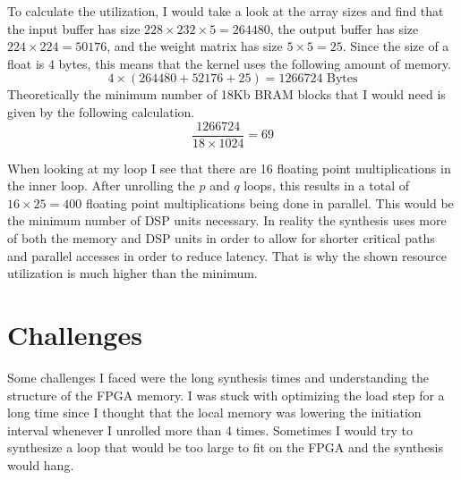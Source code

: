 \documentclass[12pt]{article}
\begin{document}
To calculate the utilization, I would take a look at the array sizes and find that the input buffer has size
\(228\times232\times5=264480\), the output buffer has size \(224\times 224=50176\), and the weight matrix has
size \(5\times 5=25\). Since the size of a float is 4 bytes, this means that the kernel uses the following amount
of memory.
\[4\times(264480+52176+25)=1266724 \text{ Bytes}\]
Theoretically the minimum number of 18Kb BRAM blocks that I would need is given by the following calculation.
\[\frac{1266724}{18\times1024}=69\]

When looking at my loop I see that there are 16 floating point multiplications in the inner loop. After unrolling
the \(p\) and \(q\) loops, this results in a total of \(16\times25=400\) floating point multiplications being done
in parallel. This would be the minimum number of DSP units necessary. In reality the synthesis uses more of both
the memory and DSP units in order to allow for shorter critical paths and parallel accesses in order to reduce latency.
That is why the shown resource utilization is much higher than the minimum.

\section{Challenges}

Some challenges I faced were the long synthesis times and understanding the structure of the FPGA memory. I was
stuck with optimizing the load step for a long time since I thought that the local memory was lowering the initiation
interval whenever I unrolled more than 4 times. Sometimes I would try to synthesize a loop that would be too large to fit
on the FPGA and the synthesis would hang.
\end{document}
